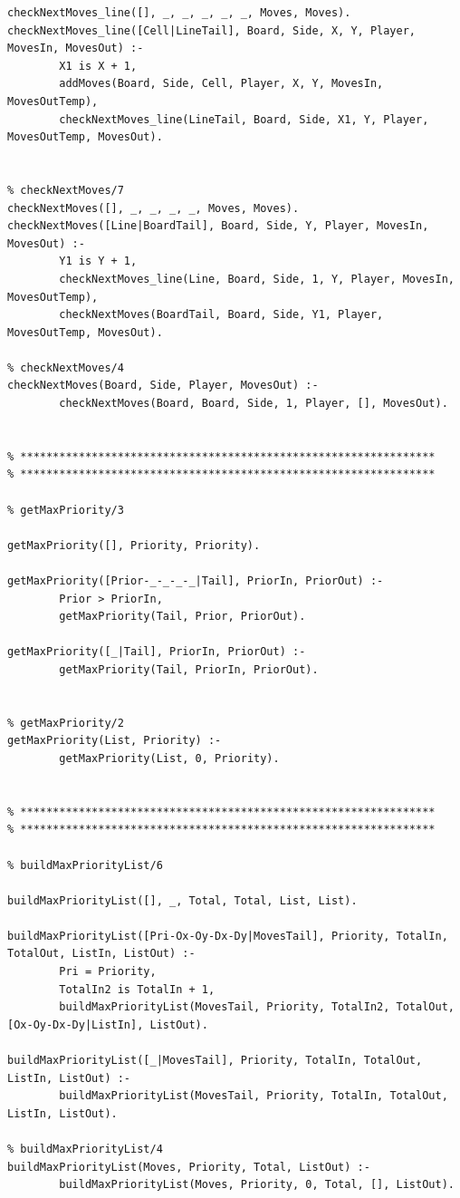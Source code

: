 \documentclass[15pt,a4paper]{article}
\begin{document}
\begin{lstlisting}
checkNextMoves_line([], _, _, _, _, _, Moves, Moves).
checkNextMoves_line([Cell|LineTail], Board, Side, X, Y, Player, MovesIn, MovesOut) :-
		X1 is X + 1,
		addMoves(Board, Side, Cell, Player, X, Y, MovesIn, MovesOutTemp),
		checkNextMoves_line(LineTail, Board, Side, X1, Y, Player, MovesOutTemp, MovesOut).
	

% checkNextMoves/7
checkNextMoves([], _, _, _, _, Moves, Moves).
checkNextMoves([Line|BoardTail], Board, Side, Y, Player, MovesIn, MovesOut) :-
		Y1 is Y + 1,
		checkNextMoves_line(Line, Board, Side, 1, Y, Player, MovesIn, MovesOutTemp),
		checkNextMoves(BoardTail, Board, Side, Y1, Player, MovesOutTemp, MovesOut).

% checkNextMoves/4
checkNextMoves(Board, Side, Player, MovesOut) :-
		checkNextMoves(Board, Board, Side, 1, Player, [], MovesOut).


% ****************************************************************
% ****************************************************************

% getMaxPriority/3

getMaxPriority([], Priority, Priority).

getMaxPriority([Prior-_-_-_-_|Tail], PriorIn, PriorOut) :-
		Prior > PriorIn,
		getMaxPriority(Tail, Prior, PriorOut).

getMaxPriority([_|Tail], PriorIn, PriorOut) :-
		getMaxPriority(Tail, PriorIn, PriorOut).

		
% getMaxPriority/2
getMaxPriority(List, Priority) :-
		getMaxPriority(List, 0, Priority).
		

% ****************************************************************
% ****************************************************************

% buildMaxPriorityList/6

buildMaxPriorityList([], _, Total, Total, List, List).

buildMaxPriorityList([Pri-Ox-Oy-Dx-Dy|MovesTail], Priority, TotalIn, TotalOut, ListIn, ListOut) :-
		Pri = Priority,
		TotalIn2 is TotalIn + 1,
		buildMaxPriorityList(MovesTail, Priority, TotalIn2, TotalOut, [Ox-Oy-Dx-Dy|ListIn], ListOut).

buildMaxPriorityList([_|MovesTail], Priority, TotalIn, TotalOut, ListIn, ListOut) :-
		buildMaxPriorityList(MovesTail, Priority, TotalIn, TotalOut, ListIn, ListOut).

% buildMaxPriorityList/4
buildMaxPriorityList(Moves, Priority, Total, ListOut) :-
		buildMaxPriorityList(Moves, Priority, 0, Total, [], ListOut).



\end{lstlisting}
\end{document}
